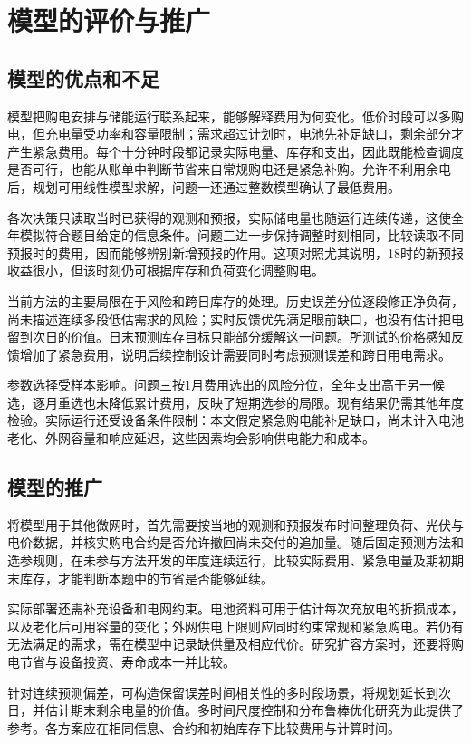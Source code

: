 \section{模型的评价与推广}
\subsection{模型的优点和不足}
模型把购电安排与储能运行联系起来，能够解释费用为何变化。低价时段可以多购电，但充电量受功率和容量限制；需求超过计划时，电池先补足缺口，剩余部分才产生紧急费用。每个十分钟时段都记录实际电量、库存和支出，因此既能检查调度是否可行，也能从账单中判断节省来自常规购电还是紧急补购。允许不利用余电后，规划可用线性模型求解，问题一还通过整数模型确认了最低费用。

各次决策只读取当时已获得的观测和预报，实际储电量也随运行连续传递，这使全年模拟符合题目给定的信息条件。问题三进一步保持调整时刻相同，比较读取不同预报时的费用，因而能够辨别新增预报的作用。这项对照尤其说明，18时的新预报收益很小，但该时刻仍可根据库存和负荷变化调整购电。

当前方法的主要局限在于风险和跨日库存的处理。历史误差分位逐段修正净负荷，尚未描述连续多段低估需求的风险；实时反馈优先满足眼前缺口，也没有估计把电留到次日的价值。日末预测库存目标只能部分缓解这一问题。所测试的价格感知反馈增加了紧急费用，说明后续控制设计需要同时考虑预测误差和跨日用电需求。

参数选择受样本影响。问题三按1月费用选出的风险分位，全年支出高于另一候选，逐月重选也未降低累计费用，反映了短期选参的局限。现有结果仍需其他年度检验。实际运行还受设备条件限制：本文假定紧急购电能补足缺口，尚未计入电池老化、外网容量和响应延迟，这些因素均会影响供电能力和成本。

\subsection{模型的推广}
将模型用于其他微网时，首先需要按当地的观测和预报发布时间整理负荷、光伏与电价数据，并核实购电合约是否允许撤回尚未交付的追加量。随后固定预测方法和选参规则，在未参与方法开发的年度连续运行，比较实际费用、紧急电量及期初期末库存，才能判断本题中的节省是否能够延续。

实际部署还需补充设备和电网约束。电池资料可用于估计每次充放电的折损成本，以及老化后可用容量的变化；外网供电上限则应同时约束常规和紧急购电。若仍有无法满足的需求，需在模型中记录缺供量及相应代价。研究扩容方案时，还要将购电节省与设备投资、寿命成本一并比较。

针对连续预测偏差，可构造保留误差时间相关性的多时段场景，将规划延长到次日，并估计期末剩余电量的价值。多时间尺度控制和分布鲁棒优化研究为此提供了参考。各方案应在相同信息、合约和初始库存下比较费用与计算时间。\label{end:body}
